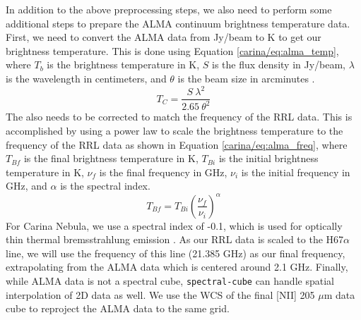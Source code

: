 In addition to the above preprocessing steps, we also need to perform some additional steps to prepare the ALMA continuum brightness temperature data.
First, we need to convert the ALMA data from Jy/beam to K to get our brightness temperature.
This is done using Equation \ref{carina/eq:alma_temp}, where $T_b$ is the brightness temperature in K, $S$ is the flux density in Jy/beam, $\lambda$ is the wavelength in centimeters, and $\theta$ is the beam size in arcminutes \citep{rohlfs2013tools}.
\begin{equation}
    T_C = \frac{S\ \lambda^2}{2.65\ \theta^2}
    \label{carina/eq:alma_temp}
\end{equation}
The also needs to be corrected to match the frequency of the RRL data.
This is accomplished by using a power law to scale the brightness temperature to the frequency of the RRL data as shown in Equation \ref{carina/eq:alma_freq}, where $T_{Bf}$ is the final brightness temperature in K, $T_{Bi}$ is the initial brightness temperature in K, $\nu_{f}$ is the final frequency in GHz, $\nu_i$ is the initial frequency in GHz, and $\alpha$ is the spectral index.
\begin{equation}
    T_{Bf} = T_{Bi} \left( \frac{\nu_f}{\nu_i} \right)^\alpha
    \label{carina/eq:alma_freq}
\end{equation}
For Carina Nebula, we use a spectral index of -0.1, which is used for optically thin thermal bremsstrahlung emission \citep{salatino2012spectral}.
As our RRL data is scaled to the H67$\alpha$ line, we will use the frequency of this line (21.385 GHz) as our final frequency, extrapolating from the ALMA data which is centered around 2.1 GHz.
Finally, while ALMA data is not a spectral cube, \texttt{spectral-cube} can handle spatial interpolation of 2D data as well.
We use the WCS of the final [NII] 205 $\mu$m data cube to reproject the ALMA data to the same grid.

